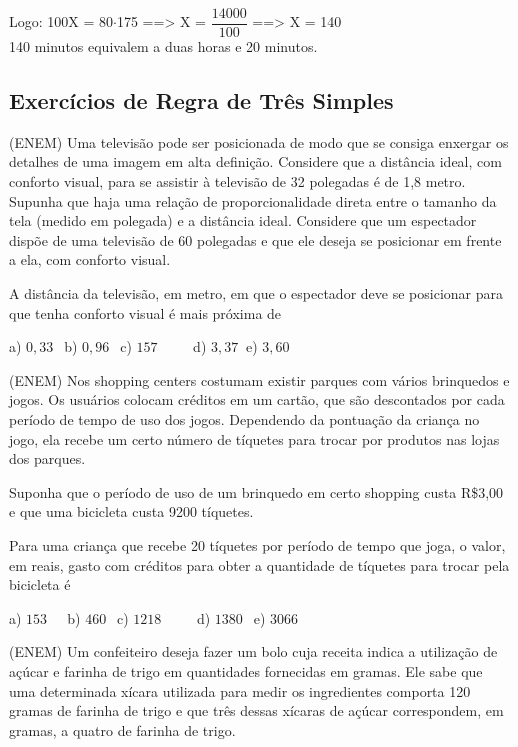 \begin{multicols*}{2}
	Logo:   100X = 80$\cdot$175    ==>  X = $\dfrac{14000}{100}$    ==>   X = 140\\

	140 minutos equivalem a duas horas e 20 minutos.

	\subsection{Exercícios de Regra de Três Simples}

		\setcounter{numexercicio}{0}
		\execnum (ENEM) Uma televisão pode ser posicionada de modo que se consiga enxergar os detalhes de uma imagem em alta definição. Considere que a distância ideal, com conforto visual, para se assistir à televisão de 32 polegadas
		      é de 1,8 metro. Supunha que haja uma relação de proporcionalidade direta entre o tamanho da tela (medido
		      em polegada) e a distância ideal. Considere que um espectador dispõe de uma televisão de 60 polegadas e que
		      ele deseja se posicionar em frente a ela, com conforto visual.

		      A distância da televisão, em metro, em que o espectador deve se posicionar para que tenha conforto visual é mais
		      próxima de

		      a) $0,33 \ \ $ b) $0,96 \ \ $ c) $157 \ \ \ \ \ \ \ \ \ \ $ d) $3,37 \ $ e) $3,60 \ \ $

		\execnum (ENEM) Nos shopping centers costumam existir parques com vários brinquedos e jogos. Os usuários
		      colocam créditos em um cartão, que são descontados por cada período de tempo de uso dos jogos. Dependendo da
		      pontuação da criança no jogo, ela recebe um certo número de tíquetes para trocar por produtos nas lojas dos parques.

		      Suponha que o período de uso de um brinquedo em certo shopping custa R\$3,00 e que uma bicicleta custa 9200 tíquetes.

		      Para uma criança que recebe 20 tíquetes por período de tempo que joga, o valor, em reais, gasto com créditos para
		      obter a quantidade de tíquetes para trocar pela bicicleta é

		      a) $153 \ \ \ \ \ $ b) $460 \ \ $ c) $1218 \ \ \ \ \ \ \ \ \ \ $ d) $1380 \ \ $ e) $3066 \ \ $

		\execnum (ENEM) Um confeiteiro deseja fazer um bolo cuja receita indica a utilização de açúcar e farinha de trigo em
		      quantidades fornecidas em gramas. Ele sabe que uma determinada xícara utilizada para medir os ingredientes
		      comporta 120 gramas de farinha de trigo e que três dessas xícaras de açúcar correspondem, em gramas, a quatro de
		      farinha de trigo.


\end{multicols*}

